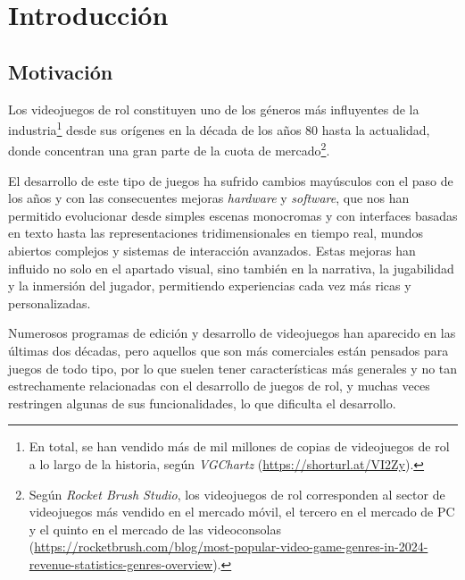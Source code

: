 \chapter{Introducción}
\label{cap:introduccion}


\section{Motivación}
Los videojuegos de rol constituyen uno de los géneros más influyentes de la industria\footnote{En total, se han vendido más de mil millones de copias de videojuegos de rol a lo largo de la historia, según \textit{VGChartz} (\url{https://shorturl.at/VI2Zy}).} desde sus orígenes en la década de los años 80 hasta la actualidad, donde concentran una gran parte de la cuota de mercado\footnote{Según \textit{Rocket Brush Studio}, los videojuegos de rol corresponden al sector de videojuegos más vendido en el mercado móvil, el tercero en el mercado de PC y el quinto en el mercado de las videoconsolas (\url{https://rocketbrush.com/blog/most-popular-video-game-genres-in-2024-revenue-statistics-genres-overview}).}.

\smallskip

El desarrollo de este tipo de juegos ha sufrido cambios mayúsculos con el paso de los años y con las consecuentes mejoras \textit{hardware} y \textit{software}, que nos han permitido evolucionar desde simples escenas monocromas y con interfaces basadas en texto hasta las representaciones tridimensionales en tiempo real, mundos abiertos complejos y sistemas de interacción avanzados. Estas mejoras han influido no solo en el apartado visual, sino también en la narrativa, la jugabilidad y la inmersión del jugador, permitiendo experiencias cada vez más ricas y personalizadas.

\medskip

Numerosos programas de edición y desarrollo de videojuegos han aparecido en las últimas dos décadas, pero aquellos que son más comerciales están pensados para juegos de todo tipo, por lo que suelen tener características más generales y no tan estrechamente relacionadas con el desarrollo de juegos de rol, y muchas veces restringen algunas de sus funcionalidades, lo que dificulta el desarrollo.

